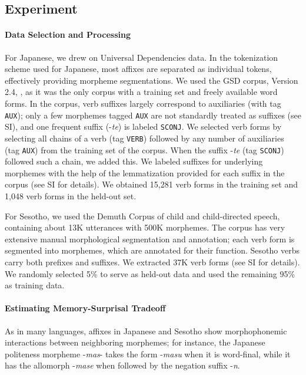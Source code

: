 \subsection{Experiment}
\paragraph{Data Selection and Processing}
For Japanese, we drew on Universal Dependencies data.
In the tokenization scheme used for Japanese, most affixes are separated as individual tokens, effectively providing morpheme segmentations.
We used the GSD corpus, Version 2.4, \citep{tanaka2016universal, asahara2018universal}, as it was the only corpus with a training set and freely available word forms.
In the corpus, verb suffixes largely correspond to auxiliaries (with tag \texttt{AUX}); only a few morphemes tagged \texttt{AUX} are not standardly treated as suffixes (see SI), and one frequent suffix (-\textit{te}) is labeled \texttt{SCONJ}.
We selected verb forms by selecting all chains of a verb (tag \texttt{VERB}) followed by any number of auxiliaries (tag \texttt{AUX}) from the training set of the corpus. When the suffix -\textit{te} (tag \texttt{SCONJ}) followed such a chain, we added this.
We labeled suffixes for underlying morphemes with the help of the lemmatization provided for each suffix in the corpus (see SI for details).
We obtained 15,281 verb forms in the training set and 1,048 verb forms in the held-out set.



For Sesotho, we used the Demuth Corpus \citep{demuth1992acquisition} of child and child-directed speech, containing about 13K utterances with 500K morphemes.
The corpus has very extensive manual morphological segmentation and annotation; each verb form is segmented into morphemes, which are annotated for their function.
Sesotho verbs carry both prefixes and suffixes.
We extracted 37K verb forms (see SI for details).
We randomly selected 5\% to serve as held-out data and used the remaining 95\% as training data.


\paragraph{Estimating Memory-Surprisal Tradeoff}
As in many languages, affixes in Japanese and Sesotho show morphophonemic interactions between neighboring morphemes; for instance, the Japanese politeness morpheme -\textit{mas}- takes the form -\textit{masu} when it is word-final, while it has the allomorph -\textit{mase} when followed by the negation suffix -\textit{n}.


